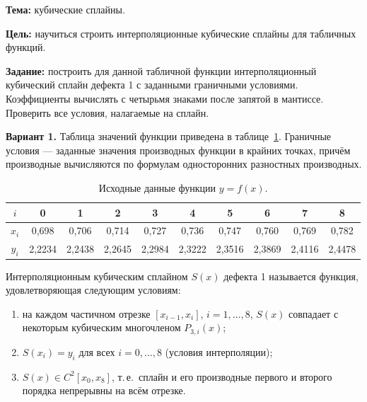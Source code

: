 \documentclass[a4paper, final]{article}
\begin{document}
\textbf{Тема:} кубические сплайны.

\textbf{Цель:} научиться строить интерполяционные кубические сплайны для
табличных функций.

\textbf{Задание:} построить для данной табличной функции интерполяционный
кубический сплайн дефекта 1 с заданными граничными условиями. Коэффициенты
вычислять с четырьмя знаками после запятой в мантиссе. Проверить все условия,
налагаемые на сплайн.

\textbf{Вариант 1.} Таблица значений функции приведена в
таблице~\ref{tab:source}. Граничные условия — заданные значения производных
функции в крайних точках, причём производные вычисляются по формулам
односторонних разностных производных.

\begin{table}[h!]
\centering
\begin{tabular}{|c|c|c|c|c|c|c|c|c|c|}
\hline
$i$   & 0 & 1 & 2 & 3 & 4 & 5 & 6 & 7 & 8 \\
\hline
$x_i$ & 0,698 & 0,706 & 0,714 & 0,727 & 0,736 & 0,747 & 0,760 & 0,769 & 0,782 \\
\hline
$y_i$ & 2,2234 & 2,2438 & 2,2645 & 2,2984 & 2,3222 & 2,3516 & 2,3869 & 2,4116 & 2,4478 \\
\hline
\end{tabular}
\caption{Исходные данные функции $y = f(x)$.}
\label{tab:source}
\end{table}

Интерполяционным кубическим сплайном $S(x)$ дефекта 1 называется функция,
удовлетворяющая следующим условиям:
\begin{enumerate}
    \item на каждом частичном отрезке $[x_{i-1}, x_i]$, $i = 1, \ldots, 8$,
          $S(x)$ совпадает с некоторым кубическим многочленом $P_{3,i}(x)$;
    \item $S(x_i) = y_i$ для всех $i = 0, \ldots, 8$ (условия интерполяции);
    \item $S(x) \in C^{2}[x_0, x_8]$, т.\,е.\ сплайн и его производные первого и
          второго порядка непрерывны на всём отрезке.
\end{enumerate}
\end{document}

